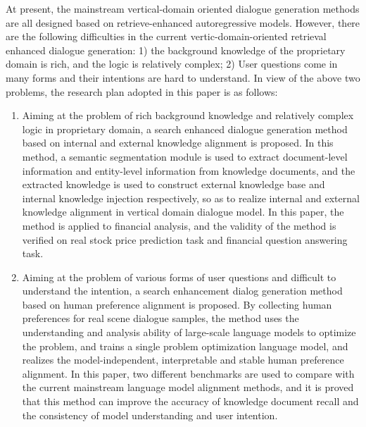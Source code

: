 At present, the mainstream vertical-domain oriented dialogue generation methods are all designed based on retrieve-enhanced autoregressive models. However, there are the following difficulties in the current vertic-domain-oriented retrieval enhanced dialogue generation: 1) the background knowledge of the proprietary domain is rich, and the logic is relatively complex; 2) User questions come in many forms and their intentions are hard to understand. In view of the above two problems, the research plan adopted in this paper is as follows:

\begin{enumerate}[topsep = 0 pt, itemsep= 0 pt, parsep=0pt, partopsep=0pt, leftmargin=0pt, itemindent=44pt, labelsep=6pt, listparindent=24pt, label=\arabic*)]
	\item Aiming at the problem of rich background knowledge and relatively complex logic in proprietary domain, a search enhanced dialogue generation method based on internal and external knowledge alignment is proposed. In this method, a semantic segmentation module is used to extract document-level information and entity-level information from knowledge documents, and the extracted knowledge is used to construct external knowledge base and internal knowledge injection respectively, so as to realize internal and external knowledge alignment in vertical domain dialogue model. In this paper, the method is applied to financial analysis, and the validity of the method is verified on real stock price prediction task and financial question answering task.

	\item Aiming at the problem of various forms of user questions and difficult to understand the intention, a search enhancement dialog generation method based on human preference alignment is proposed. By collecting human preferences for real scene dialogue samples, the method uses the understanding and analysis ability of large-scale language models to optimize the problem, and trains a single problem optimization language model, and realizes the model-independent, interpretable and stable human preference alignment. In this paper, two different benchmarks are used to compare with the current mainstream language model alignment methods, and it is proved that this method can improve the accuracy of knowledge document recall and the consistency of model understanding and user intention.
\end{enumerate}

